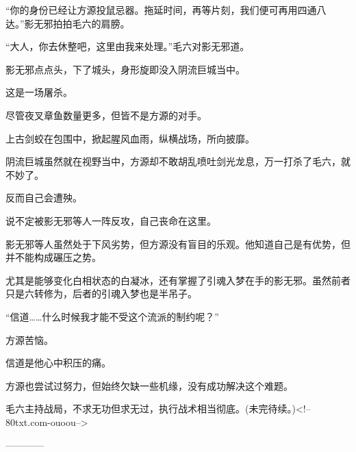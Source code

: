 \begin{this_body}
“你的身份已经让方源投鼠忌器。拖延时间，再等片刻，我们便可再用四通八达。”影无邪拍拍毛六的肩膀。

“大人，你去休整吧，这里由我来处理。”毛六对影无邪道。

影无邪点点头，下了城头，身形旋即没入阴流巨城当中。

这是一场屠杀。

尽管夜叉章鱼数量更多，但皆不是方源的对手。

上古剑蛟在包围中，掀起腥风血雨，纵横战场，所向披靡。

阴流巨城虽然就在视野当中，方源却不敢胡乱喷吐剑光龙息，万一打杀了毛六，就不妙了。

反而自己会遭殃。

说不定被影无邪等人一阵反攻，自己丧命在这里。

影无邪等人虽然处于下风劣势，但方源没有盲目的乐观。他知道自己是有优势，但并不能构成碾压之势。

尤其是能够变化白相状态的白凝冰，还有掌握了引魂入梦在手的影无邪。虽然前者只是六转修为，后者的引魂入梦也是半吊子。

“信道……什么时候我才能不受这个流派的制约呢？”

方源苦恼。

信道是他心中积压的痛。

方源也尝试过努力，但始终欠缺一些机缘，没有成功解决这个难题。

毛六主持战局，不求无功但求无过，执行战术相当彻底。(未完待续。)<!--80txt.com-ouoou-->

------------

\end{this_body}

